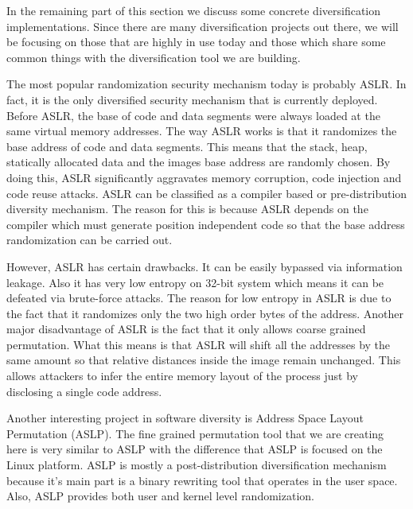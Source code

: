 \documentclass[11pt,final,conference,a4paper]{IEEEtran}
\begin{document}
In the remaining part of this section we discuss some concrete diversification implementations. Since there are many diversification projects out there, we will be focusing on those that are highly in use today and those which share some common things with the diversification tool we are building.

The most popular randomization security mechanism today is probably ASLR. In fact, it is the only diversified security mechanism that is currently deployed. Before ASLR, the base of code and data segments were always loaded at the same virtual memory addresses. The way ASLR works is that it randomizes the base address of code and data segments. This means that the stack, heap, statically allocated data and the images base address are randomly chosen. By doing this, ASLR significantly aggravates memory corruption, code injection and code reuse attacks. ASLR can be classified as a compiler based or pre-distribution diversity mechanism. The reason for this is because ASLR depends on the compiler which must generate position independent code so that the base address randomization can be carried out.

However, ASLR has certain drawbacks. It can be easily bypassed via information leakage. Also it has very low entropy on 32-bit system which means it can be defeated via brute-force attacks. The reason for low entropy in ASLR is due to the fact that it randomizes only the two high order bytes of the address. Another major disadvantage of ASLR is the fact that it only allows coarse grained permutation. What this means is that ASLR will shift all the addresses by the same amount so that relative distances inside the image remain unchanged. This allows attackers to infer the entire memory layout of the process just by disclosing a single code address.

Another interesting project in software diversity is Address Space Layout Permutation (ASLP). The fine grained permutation tool that we are creating here is very similar to ASLP with the difference that ASLP is focused on the Linux platform. ASLP is mostly a post-distribution diversification mechanism because it's main part is a binary rewriting tool that operates in the user space. Also, ASLP provides both user and kernel level randomization.
\end{document}
